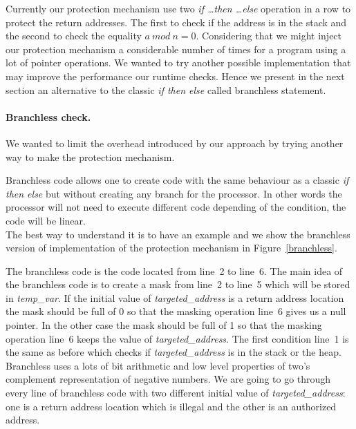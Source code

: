 \documentclass[11pt]{sdm}
\begin{document}
Currently our protection mechanism use two \textit{if \dots then \dots else} operation in a row to protect the return addresses. The first to check if the address is in the stack and the second to check the equality $a~mod~n=0$.
Considering that we might inject our protection mechanism a considerable number of times for a program using a lot of pointer operations. We wanted to try another possible implementation that may improve the performance our runtime checks.
Hence we present in the next section an alternative to the classic \textit{if then else} called branchless statement.

\paragraph{Branchless check.}
\label{par:Branchless check}

We wanted to limit the overhead introduced by our approach by trying another way to make the protection mechanism. 

Branchless code allows one to create code with the same behaviour as a classic \textit{if then else} but without creating any branch for the processor. In other words the processor will not need to execute different code depending of the condition, the code will be linear.\\
The best way to understand it is to have an example and we show the branchless version of implementation of the protection mechanism in Figure~\ref{branchless}.

The branchless code is the code located from line~2 to line~6.
The main idea of the branchless code is to create a mask from line~2 to line~5 which will be stored in \textit{temp\_var}. If the initial value of \textit{targeted\_address} is a return address location the mask should be full of 0 so that the masking operation line~6 gives us a null pointer. In the other case the mask should be full of 1 so that the masking operation line~6 keeps the value of \textit{targeted\_address}.
The first condition line~1 is the same as before which checks if \textit{targeted\_address} is in the stack or the heap.
Branchless uses a lots of bit arithmetic and low level properties of two's complement representation of negative numbers. We are going to go through every line of branchless code with two different initial value of \textit{targeted\_address}: one is a return address location which is illegal and the other is an authorized address.
\end{document}
